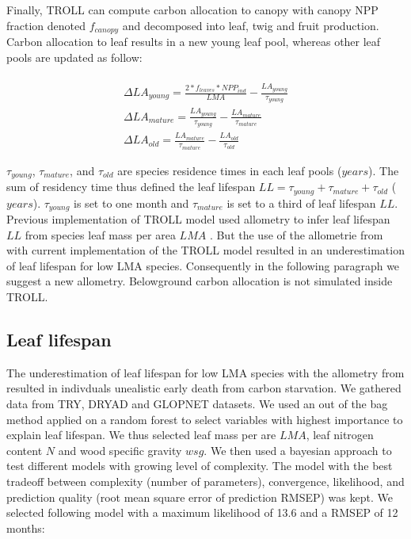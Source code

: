 \documentclass[]{article}
\theoremstyle{definition}
\theoremstyle{definition}
\theoremstyle{remark}
\begin{document}
Finally, TROLL can compute carbon allocation to canopy with canopy NPP
fraction denoted \(f_{canopy}\) and decomposed into leaf, twig and fruit
production. Carbon allocation to leaf results in a new young leaf pool,
whereas other leaf pools are updated as follow:

\begin{equation}
  \begin{array}{c} \\
   \Delta LA_{young} = \frac{2*f_{leaves}*NPP_{ind}}{LMA}-\frac{LA_{young}}{\tau_{young}} \\
  \Delta LA_{mature} = \frac{LA_{young}}{\tau_{young}} - \frac{LA_{mature}}{\tau_{mature}}\\
  \Delta LA_{old} = \frac{LA_{mature}}{\tau_{mature}} - \frac{LA_{old}}{\tau_{old}}
  \end{array}
  \label{eq:DeltaLA}
\end{equation}

\(\tau_{young}\), \(\tau_{mature}\), and \(\tau_{old}\) are species
residence times in each leaf pools (\(years\)). The sum of residency
time thus defined the leaf lifespan
\(LL = \tau_{young} + \tau_{mature} + \tau_{old}\) (\(years\)).
\(\tau_{young}\) is set to one month and \(\tau_{mature}\) is set to a
third of leaf lifespan \(LL\). Previous implementation of TROLL model
used \citet{Reich1991a} allometry to infer leaf lifespan \(LL\) from
species leaf mass per area \(LMA\) \citep{Li}. But the use of the
allometrie from \citet{Reich1991a} with current implementation of the
TROLL model resulted in an underestimation of leaf lifespan for low LMA
species. Consequently in the following paragraph we suggest a new
allometry. Belowground carbon allocation is not simulated inside TROLL.

\subsection{Leaf lifespan}\label{leaf-lifespan}

The underestimation of leaf lifespan for low LMA species with the
allometry from \citet{Reich1991a} resulted in indivduals unealistic
early death from carbon starvation. We gathered data from
TRY\citep{Kattge2011}, DRYAD \citep{chave_towards_2009} and GLOPNET
\citep{wright_worldwide_2004} datasets. We used an out of the bag method
applied on a random forest to select variables with highest importance
to explain leaf lifespan. We thus selected leaf mass per are \(LMA\),
leaf nitrogen content \(N\) and wood specific gravity \(wsg\). We then
used a bayesian approach to test different models with growing level of
complexity. The model with the best tradeoff between complexity (number
of parameters), convergence, likelihood, and prediction quality (root
mean square error of prediction RMSEP) was kept. We selected following
model with a maximum likelihood of 13.6 and a RMSEP of 12 months:
\end{document}
